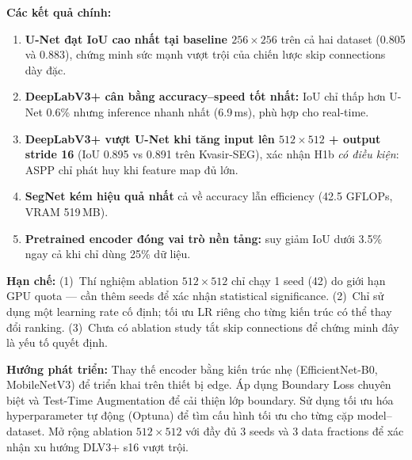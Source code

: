 \documentclass{article}
\begin{document}
\textbf{Các kết quả chính:}
\begin{enumerate}
    \item \textbf{U-Net đạt IoU cao nhất tại baseline $256{\times}256$} trên cả hai dataset (0.805 và 0.883), chứng minh sức mạnh vượt trội của chiến lược skip connections dày đặc.
    \item \textbf{DeepLabV3+ cân bằng accuracy--speed tốt nhất:} IoU chỉ thấp hơn U-Net 0.6\% nhưng inference nhanh nhất (6.9\,ms), phù hợp cho real-time.
    \item \textbf{DeepLabV3+ vượt U-Net khi tăng input lên $512{\times}512$ + output stride 16} (IoU 0.895 vs 0.891 trên Kvasir-SEG), xác nhận H1b \emph{có điều kiện}: ASPP chỉ phát huy khi feature map đủ lớn.
    \item \textbf{SegNet kém hiệu quả nhất} cả về accuracy lẫn efficiency (42.5 GFLOPs, VRAM 519\,MB).
    \item \textbf{Pretrained encoder đóng vai trò nền tảng:} suy giảm IoU dưới 3.5\% ngay cả khi chỉ dùng 25\% dữ liệu.
\end{enumerate}

\textbf{Hạn chế:}
(1)~Thí nghiệm ablation $512{\times}512$ chỉ chạy 1 seed (42) do giới hạn GPU quota --- cần thêm seeds để xác nhận statistical significance.
(2)~Chỉ sử dụng một learning rate cố định; tối ưu LR riêng cho từng kiến trúc có thể thay đổi ranking.
(3)~Chưa có ablation study tắt skip connections để chứng minh đây là yếu tố quyết định.

\textbf{Hướng phát triển:}
Thay thế encoder bằng kiến trúc nhẹ (EfficientNet-B0, MobileNetV3) để triển khai trên thiết bị edge.
Áp dụng Boundary Loss chuyên biệt và Test-Time Augmentation để cải thiện lớp boundary.
Sử dụng tối ưu hóa hyperparameter tự động (Optuna) để tìm cấu hình tối ưu cho từng cặp model--dataset.
Mở rộng ablation $512{\times}512$ với đầy đủ 3 seeds và 3 data fractions để xác nhận xu hướng DLV3+ s16 vượt trội.


\label{sec:refs}

\end{document}
